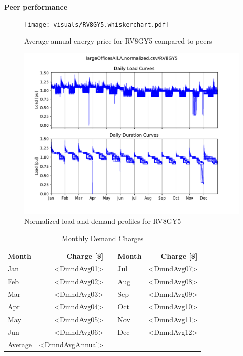 \documentclass[11pt]{article}
\begin{document}
\vspace{3ex}
\textbf{\Large Peer performance}
\vspace{1ex}

\lipsum[1][1-7]

\begin{figure}[!h]
\centering
\texttt{[image: visuals/RV8GY5.whiskerchart.pdf]}
\caption{Average annual energy price for RV8GY5 compared to peers}
\label{fig:PeerCompEn}
\end{figure}

\clearpage

\pagestyle{demand}
\lipsum[1][1-7]

\begin{figure}[!h]
\centering
\includegraphics[width=\columnwidth, page=1, trim=0in 0.45in 0in 0.45in, clip]{visuals/RV8GY5.duration.monthly.test.pdf}
\caption{Normalized load and demand profiles for RV8GY5}
\label{fig:duration}
\end{figure}

\lipsum[1][1-7]

\begin{table}[th!]
  \centering
  \caption{Monthly Demand Charges}
  \vspace{1.5ex}
  \label{tab:demand}
  \begin{tabular}{p{0.75in}rp{0.2in}p{0.75in}r}
    Month & Charge [\$] & & Month & Charge [\$] \\
    \midrule
    Jan & <DmndAvg01> & & Jul & <DmndAvg07> \\
    Feb & <DmndAvg02> & & Aug & <DmndAvg08> \\
    Mar & <DmndAvg03> & & Sep & <DmndAvg09> \\
    Apr & <DmndAvg04> & & Oct & <DmndAvg10> \\
    May & <DmndAvg05> & & Nov & <DmndAvg11> \\
    Jun & <DmndAvg06> & & Dec & <DmndAvg12> \\
    \midrule
    Average & <DmndAvgAnnual>
  \end{tabular}
\end{table}
\end{document}
